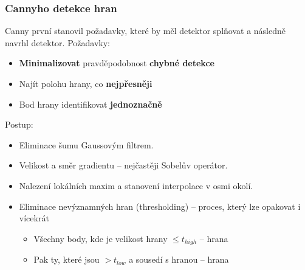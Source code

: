 \subsubsection{Cannyho detekce hran}
Canny první stanovil požadavky, které by měl detektor splňovat a následně navrhl detektor. %
Požadavky:
\begin{itemize}
	\item \textbf{Minimalizovat} pravděpodobnost \textbf{chybné detekce}
	\item Najít polohu hrany, co \textbf{nejpřesněji}
	\item Bod hrany identifikovat \textbf{jednoznačně}
\end{itemize}
Postup:
\begin{itemize}
	\item Eliminace šumu Gaussovým filtrem.
	\item Velikost a směr gradientu -- nejčastěji Sobelův operátor.
	\item Nalezení lokálních maxim a stanovení interpolace v osmi okolí.
	\item Eliminace nevýznamných hran (thresholding) -- proces, který lze opakovat i vícekrát
	\begin{itemize}
		\item Všechny body, kde je velikost hrany $\leq t_{high}$ --  hrana
		\item Pak ty, které jsou $ > t_{low}$ a sousedí s hranou --  hrana
	\end{itemize}
\end{itemize}

